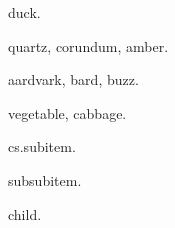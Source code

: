 \documentclass{article}
\begin{document}
\gls{duck}.

\gls{quartz}, \gls{corundum}, \gls{amber}.

\gls{aardvark}, \gls{bard}, \gls{buzz}.

\gls{vegetable}, \gls{cabbage}.

\gls{cs.subitem}.

\gls{subsubitem}.

\gls{child}.

\printunsrtglossaries
\end{document}
